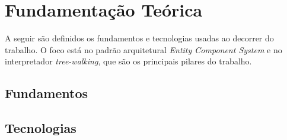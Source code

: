 \chapter{Fundamentação Teórica}\label{ch:fundamentacao}

A seguir são definidos os fundamentos e tecnologias usadas ao decorrer do trabalho. O foco está no padrão arquitetural \textit{Entity Component System} e no interpretador \textit{tree-walking}, que são os principais pilares do trabalho.

\section{Fundamentos}













\section{Tecnologias}







